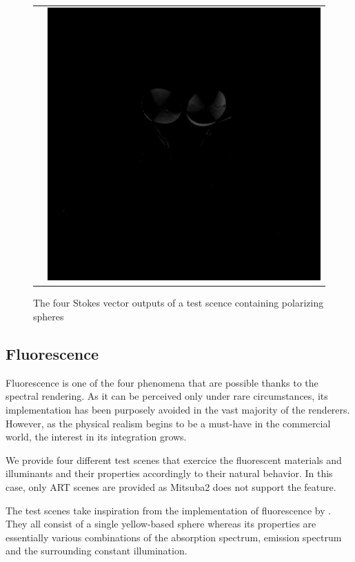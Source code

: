 \begin{figure}[h]
\begin{tabular}{cc}
		&
		\includegraphics[width=.45\linewidth]{img/polarizing_spheres.s3.png}
	\end{tabular}
	\caption{The four Stokes vector outputs of a test scence containing polarizing spheres}
	\label{fig:polar_spheres}
\end{figure}

\subsection{Fluorescence}

Fluorescence is one of the four phenomena that are possible thanks to the spectral rendering. As it can be perceived only under rare circumstances, its implementation has been purposely avoided in the vast majority of the renderers. However, as the physical realism begins to be a must-have in the commercial world, the interest in its integration grows.

We provide four different test scenes that exercice the fluorescent materials and illuminants and their properties accordingly to their natural behavior. In this case, only ART scenes are provided as Mitsuba2 does not support the feature. 

The test scenes take inspiration from the implementation of fluorescence by \citet{mojzik2018handling}. They all consist of a single yellow-based sphere whereas its properties are essentially various combinations of the absorption spectrum, emission spectrum and the surrounding constant illumination.

